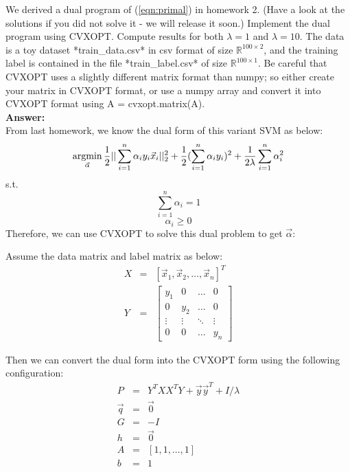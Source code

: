 We derived a dual program of (\ref{eqn:primal}) in homework 2. (Have a look at the solutions if you did not solve it - we will release it soon.) Implement the dual program using CVXOPT. Compute results for both $\lambda=1$ and $\lambda=10$. The data is a toy dataset *train\_data.csv* in {\color{red}csv} format of size $\mathbb{R}^{100\times 2}$, and the training label is contained in the file *train\_label.csv* of size $\mathbb{R}^{100\times 1}$. Be careful that CVXOPT uses a slightly different matrix format than numpy; so either create your matrix in CVXOPT format, or use a numpy array and convert it into CVXOPT format using \textsf{A = cvxopt.matrix(A)}. \\
\textbf{Answer:}\\
From last homework, we know the dual form of this variant SVM as below:
$$\operatorname*{\mathrm{argmin}}_{\vec{\alpha}}\frac{1}{2}||\sum_{i=1}^{n}\alpha_iy_i\vec{x}_i||_2^2 + \frac{1}{2}(\sum_{i=1}^{n}\alpha_iy_i)^2 + \frac{1}{2\lambda}\sum_{i=1}^{n}\alpha_i^2 $$
s.t.
$$\sum_{i=1}^{n}\alpha_i=1$$
$$\alpha_i \geq 0$$
Therefore, we can use CVXOPT to solve this dual problem to get $\vec{\alpha}$:

Assume the data matrix and label matrix as below:
$$$$
\begin{equation}
\nonumber
\begin{array}{rcl}
X & = & [\vec{x}_1,\vec{x}_2,\dots,\vec{x}_n]^T \\
Y & = & \left[\begin{array}{cccc}
y_1 & 0 & \dots & 0 \\
0 & y_2 & \dots & 0 \\
\vdots & \vdots & \ddots & \vdots \\
0 & 0 & \dots & y_n
\end{array}\right]
\end{array}
\end{equation}

Then we can convert the dual form into the CVXOPT form using the following configuration:
\begin{equation}
\nonumber
\begin{array}{rcl}
P & = & Y^TXX^TY+\vec{y}\vec{y}^T+I/\lambda \\
\vec{q} & = & \vec{0} \\
G & = & -I \\
h & = & \vec{0} \\
A & = & [1,1,\dots,1] \\
b & = & 1 \\
\end{array}
\end{equation}


